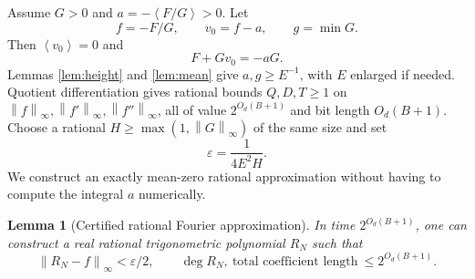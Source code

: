 \documentclass[11pt]{article}
\newtheorem{lemma}[theorem]{Lemma}
\theoremstyle{remark}\newtheorem{remark}[theorem]{Remark}
\newcommand{\mean}[1]{\left\langle #1\right\rangle}
\newcommand{\norm}[1]{\left\|#1\right\|_\infty}
\newcommand{\se}{2^{O_d(B+1)}}
\begin{document}
Assume \(G>0\) and \(a=-\mean{F/G}>0\). Let
\[
 f=-F/G,\qquad v_0=f-a,\qquad g=\min G.
\]
Then \(\mean{v_0}=0\) and
\[
                       F+Gv_0=-aG.
\]
Lemmas \ref{lem:height} and \ref{lem:mean} give \(a,g\geq E^{-1}\), with \(E\) enlarged if needed. Quotient differentiation gives rational bounds \(Q,D,T\geq1\) on
\(\norm f,\norm{f'},\norm{f''}\), all of value \(\se\) and bit length \(O_d(B+1)\).
Choose a rational \(H\geq\max(1,\norm G)\) of the same size and set
\[
                         \varepsilon=\frac1{4E^2H}.
\]
We construct an exactly mean-zero rational approximation without having to compute the integral \(a\) numerically.

\begin{lemma}[Certified rational Fourier approximation]\label{lem:quad}
In time \(\se\), one can construct a real rational trigonometric polynomial \(R_N\) such that
\[
 \norm{R_N-f}<\varepsilon/2,\qquad
 \deg R_N,\ \text{total coefficient length}\ \leq\se.
\]
\end{lemma}
\end{document}
